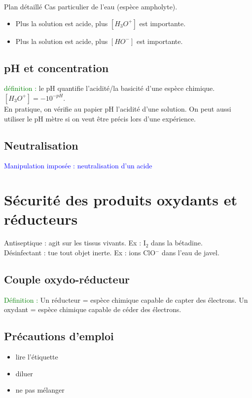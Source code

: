 \begin{reportBlock}{Plan détaillé}
Cas particulier de l'eau (espèce ampholyte).\\

\begin{itemize}
    \item Plus la solution est acide, plus $[H_3O^+]$ est importante.
    \item Plus la solution est acide, plus $[HO^-]$ est importante.
\end{itemize}

\subsection{pH et concentration}

\textcolor{green}{définition :} le pH quantifie l'acidité/la basicité d'une espèce chimique. $[H_3O^+]=-10^{-pH}$.\\

En pratique, on vérifie au papier pH l'acidité d'une solution. On peut aussi utiliser le pH mètre si on veut être précis lors d'une expérience.

\subsection{Neutralisation}

\textcolor{blue}{Manipulation imposée : neutralisation d'un acide}

\section{Sécurité des produits oxydants et réducteurs}

Antiseptique : agit sur les tissus vivants. Ex : I$_2$ dans la bétadine.\\

Désinfectant : tue tout objet inerte. Ex : ions ClO$^-$ dans l'eau de javel.

\subsection{Couple oxydo-réducteur}
\textcolor{green}{Définition :} Un réducteur = espèce chimique capable de capter des électrons. Un oxydant = espèce chimique capable de céder des électrons.

\subsection{Précautions d'emploi}
\begin{itemize}
    \item lire l'étiquette
    \item diluer
    \item ne pas mélanger
\end{itemize}


\end{reportBlock}
